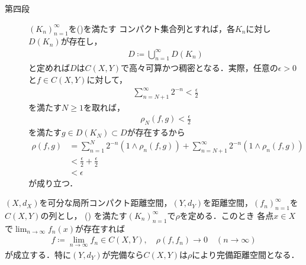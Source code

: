 \begin{prf}
\begin{description}
			\item[第四段]				
				$(K_n)_{n=1}^\infty$を()を満たす
				コンパクト集合列とすれば，各$K_n$に対し$D(K_n)$が存在し，
				\begin{align}
					D \coloneqq \bigcup_{n=1}^\infty D(K_n)
				\end{align}
				と定めれば$D$は$C(X,Y)$で高々可算かつ稠密となる．実際，任意の$\epsilon > 0$と$f \in C(X,Y)$に対して，
				\begin{align}
					\sum_{n=N+1}^\infty 2^{-n} < \frac{\epsilon}{2}
				\end{align}
				を満たす$N \geq 1$を取れば，
				\begin{align}
					\rho_N(f,g) < \frac{\epsilon}{2}
				\end{align}
				を満たす$g \in D(K_N) \subset D$が存在するから
				\begin{align}
					\rho(f,g) &= \sum_{n=1}^N 2^{-n} \left( 1 \wedge \rho_n(f,g) \right)
						+ \sum_{n=N+1}^\infty 2^{-n} \left( 1 \wedge \rho_n(f,g) \right) \\
					&< \frac{\epsilon}{2} + \frac{\epsilon}{2} \\
					&< \epsilon
				\end{align}
				が成り立つ．
				\QED
		\end{description}
	\end{prf}
	
	\begin{screen}
		\begin{thm}[$C(X,Y)$の完備性]\label{thm:completeness_of_spaces_of_continuous_functions}
			$(X,d_X)$を可分な局所コンパクト距離空間，$(Y,d_Y)$を距離空間，$(f_n)_{n=1}^\infty$を$C(X,Y)$の列とし，
			()
			を満たす$(K_n)_{n=1}^\infty$で$\rho$を定める．このとき
			各点$x \in X$で$\lim_{n \to \infty} f_n(x)$が存在すれば
			\begin{align}
				f \coloneqq \lim_{n \to \infty} f_n \in C(X,Y),
				\quad \rho(f,f_n) \longrightarrow 0 \quad (n \longrightarrow \infty)
				\label{eq:completeness_and_separability_of_space_of_continuous_functions_3}
			\end{align}
			が成立する．特に$(Y,d_Y)$が完備なら$C(X,Y)$は$\rho$により完備距離空間となる．
		\end{thm}
	\end{screen}
	
